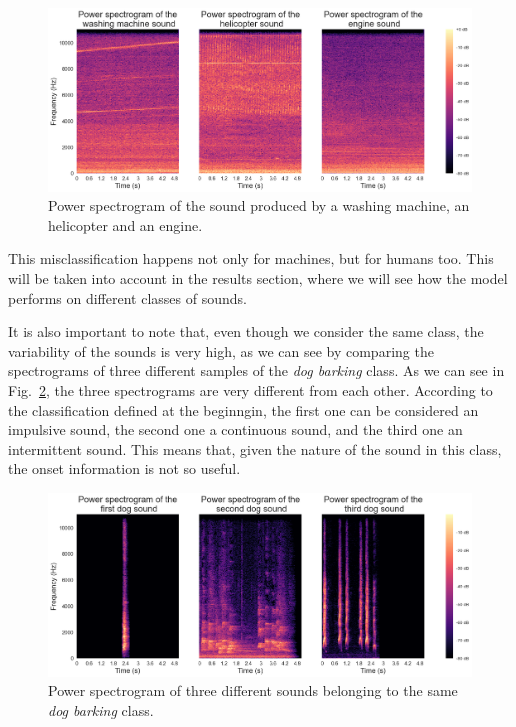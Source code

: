 \documentclass{article}
\begin{document}
\begin{sloppy}
\begin{figure}[ht]
  \centering
  \centerline{\includegraphics[width=\columnwidth]{Ambiguous_sounds.png}}
  \caption{Power spectrogram of the sound produced by a washing machine, an helicopter and an engine.}
  \label{fig:Ambiguous_sounds}
\end{figure}

This misclassification happens not only for machines, but for humans too. This will be taken into account in the results section, where we will see how the model performs on different classes of sounds.

It is also important to note that, even though we consider the same class, the variability of the sounds is very high, as we can see by comparing the spectrograms of three different
samples of the \textit{dog barking} class. As we can see in Fig.~\ref{fig:Dog_barking}, the three spectrograms are very different from each other. According to the classification defined at the beginngin,
the first one can be considered an impulsive sound, the second one a continuous sound, and the third one an intermittent sound. This means that, given the nature of the sound in this class,
the onset information is not so useful.

\begin{figure}[ht]
  \centering
  \centerline{\includegraphics[width=\columnwidth]{dog_barking.png}}
  \caption{Power spectrogram of three different sounds belonging to the same \textit{dog barking} class.}
  \label{fig:Dog_barking}
\end{figure}


\end{sloppy}
\end{document}
